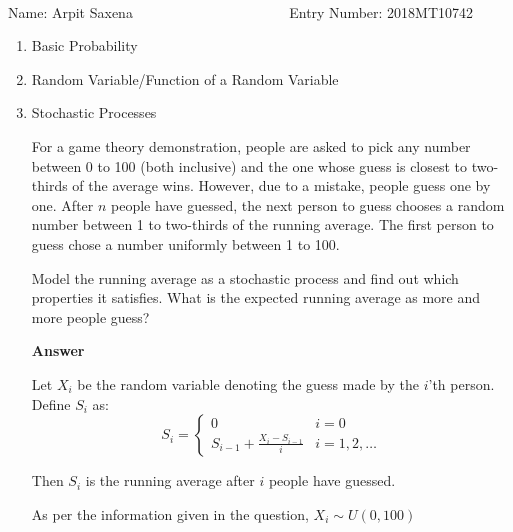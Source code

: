 \documentclass[12pt, oneside]{article}
\begin{document}
\setlength{\textheight}{8.5in}
\\





\vskip 0.5cm

\noindent Name: Arpit Saxena ~~~~~~~~~~~~~~~~~~~~~ Entry Number: 2018MT10742



\vskip 0.5cm



\begin{enumerate}
	




\item Basic Probability

\item Random Variable/Function of a Random Variable



\item {
    Stochastic Processes

    For a game theory demonstration, people are asked to pick any number between 0 to 100
    (both inclusive) and the one whose guess is closest to two-thirds of the average wins.
    However, due to a mistake, people guess one by one. After \(n\) people have guessed,
    the next person to guess chooses a random number between 1 to two-thirds of the running
    average. The first person to guess chose a number uniformly between 1 to 100.

    Model the running average as a stochastic process and find out which properties 
    it satisfies. What is the expected running average as more and more people guess?

    \textbf{Answer}

    Let \(X_i\) be the random variable denoting the guess made by the \(i\)'th person.
    Define \(S_i\) as:
    \[
        S_i = \begin{cases}
            0 & i = 0 \\
            S_{i-1} + \frac{X_i - S_{i - 1}}{i} & i = 1, 2, \ldots
        \end{cases}
    \]

    Then \(S_i\) is the running average after \(i\) people have guessed.
    
    As per the information given in the question, \(X_i \sim U(0, 100)\)

}
\end{enumerate}
\end{document}
